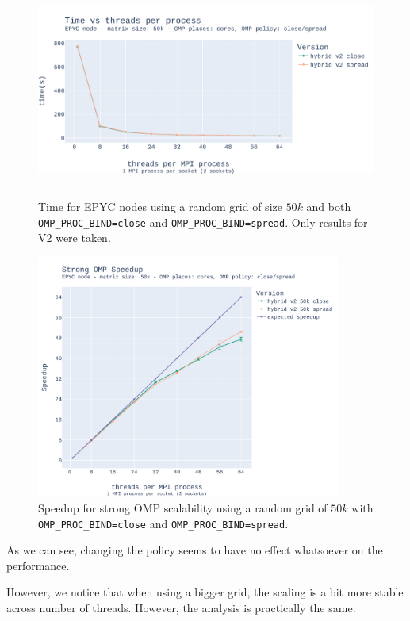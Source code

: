 \documentclass{report}
\begin{document}
\begin{figure}[H]
\centering
\includegraphics[width=14cm, height=7cm]{./images/strong_OMP_epyc_hybrid_grid_050k.pdf}
\caption{\label{fig:strongomp10kepyc} Time for EPYC nodes using a random grid of size 
$50k$ and both \texttt{OMP\_PROC\_BIND=close} and \texttt{OMP\_PROC\_BIND=spread}. 
Only results for V2 were taken.}
\end{figure}

\begin{figure}[H]
\centering
\includegraphics[width=10cm, height=8cm]{./images/strong_OMP_epyc_hybrid_grid_050k_speedup.pdf}
\caption{\label{fig:strongomp10kspeedupepyc}Speedup for strong OMP scalability using a random 
grid of $50k$ with \texttt{OMP\_PROC\_BIND=close} and \texttt{OMP\_PROC\_BIND=spread}. }
\end{figure}
As we can see, changing the policy seems to have no effect whatsoever on the 
performance. 

However, we notice that when using a bigger grid, the scaling is a bit more stable 
across number of threads. However, the analysis is practically the same.
\end{document}
